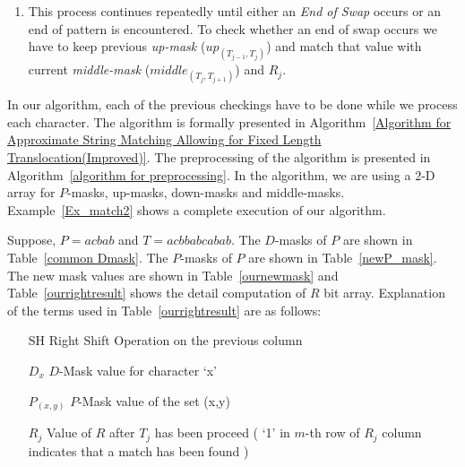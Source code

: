\documentclass{llncs}
\begin{document}
{\begin{enumerate}
\item This process continues repeatedly until either an \emph{End of Swap} occurs or an end of pattern is encountered. To check whether an end of swap occurs we have to keep previous \emph{up-mask} ($up_{(T_{j-1},T_{j})}$) and match that value with current \emph{middle-mask} ($middle_{(T_{j},T_{j+1})}$) and $R_j$. 
\end{enumerate}  




In our algorithm, each of the previous checkings have to be done while we process each character. The algorithm is formally presented in Algorithm~\ref{Algorithm for Approximate String Matching Allowing for Fixed Length Translocation(Improved)}. The preprocessing of the algorithm is presented in Algorithm~\ref{algorithm for preprocessing}. In the algorithm, we are using a $2$-D array for $P$-masks, up-masks, down-masks and middle-masks. Example~\ref{Ex_match2} shows a complete execution of our algorithm.

\begin{example}\label{Ex_match2}
Suppose, $P = acbab$ and $T = acbbabcabab$. The $D$-masks of $P$ are shown in Table~\ref{common Dmask}. The $P$-masks of $P$ are shown in Table~\ref{newP_mask}. The new mask values are shown in Table~\ref{ournewmask} and Table~\ref{ourrightresult} shows the detail computation of $R$ bit array. Explanation of the terms used in Table~\ref{ourrightresult} are as follows:   

\begin{itemize}
\item[SH] Right Shift Operation on the previous column
\item[$D_x$] $D$-Mask value for character `x'
\item[$P_{(x,y)}$] $P$-Mask value of the set (x,y)
\item[$R_j$] Value of $R$ after $T_j$ has been proceed ( `1' in $m$-th row of $R_j$ column indicates that a match has been found )
\end{itemize}
\end{example}





}
\end{document}
